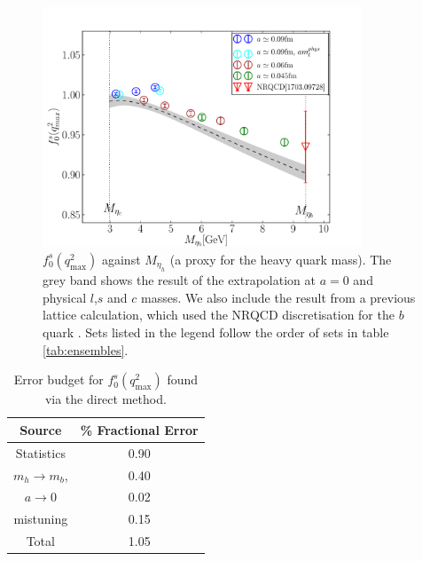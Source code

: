 \begin{figure}[htb!]
  \begin{center}
  \hspace{-10pt}
  \includegraphics[width=0.85\textwidth]{images/BsDs/direct/f0q2max_vsmh.pdf}
  \caption{ $f_0^s(q^2_{\text{max}})$ against $M_{\eta_h}$ (a proxy for the heavy quark mass). The grey band shows the result of the extrapolation at $a=0$ and physical $l$,$s$ and $c$ masses. We also include the result from a previous lattice calculation, which used the NRQCD discretisation for the $b$ quark \cite{Monahan:2017uby}. Sets listed in the legend follow the order of sets in table \ref{tab:ensembles}. \label{fig:directq2max}}
  \end{center}
\end{figure}

\begin{table}[htb!]
  \begin{center}
    \begin{tabular}{c c}
      \hline
      Source & \% Fractional Error \\ [0.5ex]
      \hline
      Statistics & 0.90  \\ [1ex]
      $m_h \to m_b$, & 0.40  \\ [1ex]
      $a\to 0$ & 0.02  \\ [1ex]
      mistuning & 0.15 \\ [1ex]
      \hline
      Total & 1.05 \\ [1ex]
      \hline
    \end{tabular}
  \end{center}
  \caption{Error budget for $f_0^s(q^2_{\text{max}})$ found via the direct method.\label{directq2max_budget}}
\end{table}

